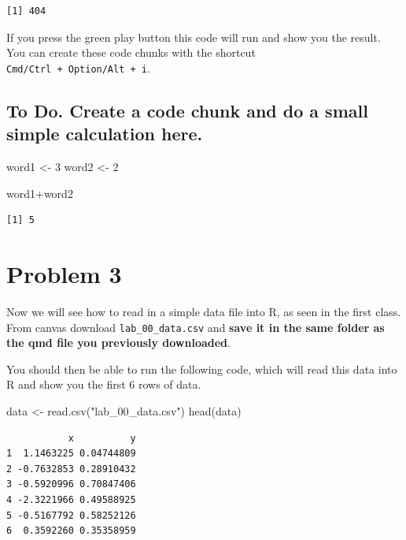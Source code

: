 \documentclass[
  letterpaper,
  DIV=11,
  numbers=noendperiod]{scrartcl}
\newenvironment{Shaded}{\begin{snugshade}}{\end{snugshade}}
\newcommand{\DecValTok}[1]{\textcolor[rgb]{0.68,0.00,0.00}{#1}}
\newcommand{\FunctionTok}[1]{\textcolor[rgb]{0.28,0.35,0.67}{#1}}
\newcommand{\NormalTok}[1]{\textcolor[rgb]{0.00,0.23,0.31}{#1}}
\newcommand{\OtherTok}[1]{\textcolor[rgb]{0.00,0.23,0.31}{#1}}
\newcommand{\SpecialCharTok}[1]{\textcolor[rgb]{0.37,0.37,0.37}{#1}}
\newcommand{\StringTok}[1]{\textcolor[rgb]{0.13,0.47,0.30}{#1}}
\begin{document}
\begin{verbatim}
[1] 404
\end{verbatim}

If you press the green play button this code will run and show you the
result. You can create these code chunks with the shortcut
\texttt{Cmd/Ctrl\ +\ Option/Alt\ +\ i}.

\subsection{\texorpdfstring{\textbf{To Do}. Create a code chunk and do a
small simple calculation
here.}{To Do. Create a code chunk and do a small simple calculation here.}}\label{to-do.-create-a-code-chunk-and-do-a-small-simple-calculation-here.}

\begin{Shaded}
\begin{Highlighting}[]
\NormalTok{word1 }\OtherTok{\textless{}{-}} \DecValTok{3}
\NormalTok{word2 }\OtherTok{\textless{}{-}} \DecValTok{2}
  
\NormalTok{word1}\SpecialCharTok{+}\NormalTok{word2}
\end{Highlighting}
\end{Shaded}

\begin{verbatim}
[1] 5
\end{verbatim}

\section{Problem 3}\label{problem-3}

Now we will see how to read in a simple data file into R, as seen in the
first class. From canvas download \texttt{lab\_00\_data.csv} and
\textbf{save it in the same folder as the qmd file you previously
downloaded}.

You should then be able to run the following code, which will read this
data into R and show you the first 6 rows of data.

\begin{Shaded}
\begin{Highlighting}[]
\NormalTok{data }\OtherTok{\textless{}{-}} \FunctionTok{read.csv}\NormalTok{(}\StringTok{"lab\_00\_data.csv"}\NormalTok{)}
\FunctionTok{head}\NormalTok{(data)}
\end{Highlighting}
\end{Shaded}

\begin{verbatim}
           x          y
1  1.1463225 0.04744809
2 -0.7632853 0.28910432
3 -0.5920996 0.70847406
4 -2.3221966 0.49588925
5 -0.5167792 0.58252126
6  0.3592260 0.35358959
\end{verbatim}
\end{document}
